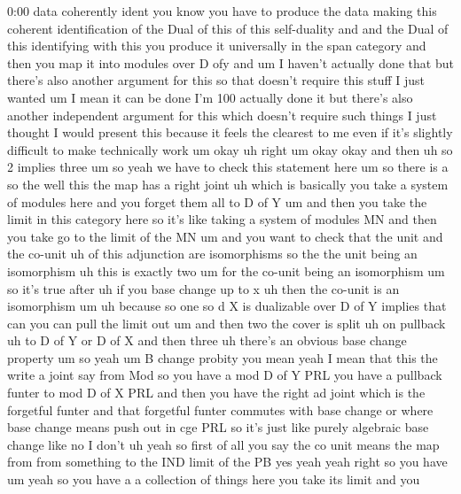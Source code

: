 \begin{unfinished}{0:00}
data  coherently  ident  you  know  you  have
to  produce  the  data  making  this  coherent
identification  of  the  Dual  of  this  of
this  self-duality  and  and  the  Dual  of
this  identifying  with  this  you  produce
it  universally  in  the  span  category  and
then  you  map  it  into  modules  over  D
ofy  and
um  I  haven't  actually  done  that  but
there's  also  another  argument  for  this
so  that  doesn't  require  this  stuff  I
just  wanted  um  I  mean  it  can  be  done  I'm
100%
actually  done  it
but  there's  also  another  independent
argument  for  this  which  doesn't  require
such  things  I  just  thought  I  would
present  this  because  it  feels  the
clearest  to  me  even  if  it's  slightly
difficult  to  make  technically
work
um
okay  uh
right
um  okay
okay  and  then
uh
so  2  implies
three
um  so  yeah  we  have  to  check  this
statement  here
um  so  there  is  a  so  the  well
this
the
map  has  a  right
joint  uh  which  is  basically  you  take  a
system  of  modules  here  and  you  forget
them  all  to  D  of  Y  um  and  then  you  take
the  limit  in  this  category  here  so  it's
like  taking  a  system  of  modules  MN  and
then  you  take  go  to  the  limit  of  the  MN
um  and  you  want  to  check  that  the  unit
and  the  co-unit  uh  of  this  adjunction
are
isomorphisms  so  the  the  unit  being  an
isomorphism  uh  this  is  exactly
two
um
for  the  co-unit  being  an
isomorphism  um  so  it's  true
after
uh  if  you  base  change  up  to  x  uh  then
the  co-unit  is  an
isomorphism
um  uh
because  so  one  so  d  X  is
dualizable  over  D  of  Y  implies  that  can
you  can  pull  the  limit
out  um  and  then  two  the  cover  is
split  uh  on
pullback  uh  to  D  of  Y  or  D  of
X  and  then  three
uh  there's  an  obvious  base  change
property
um
so
yeah
um  B  change  probity  you  mean  yeah  I  mean
that  this  the  write  a  joint  say  from  Mod
so  you  have  a  mod  D  of  Y  PRL  you  have  a
pullback  funter  to  mod  D  of  X  PRL  and
then  you  have  the  right  ad  joint  which
is  the  forgetful  funter  and  that
forgetful  funter  commutes  with  base
change  or  where  base  change  means  push
out  in  cge  PRL  so  it's  just  like  purely
algebraic  base  change  like  no  I  don't  uh
yeah  so  first  of  all  you  say  the  co  unit
means  the  map  from  from  something  to  the
IND  limit  of  the  PB  yes
yeah
yeah  right  so  you  have
um  yeah  so  you  have  a  a  collection  of
things  here  you  take  its  limit  and  you

\end{unfinished}
